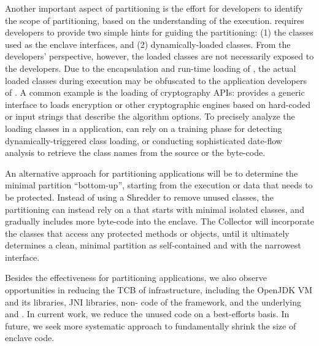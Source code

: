 Another important aspect of partitioning is
the effort for developers
to identify the scope of partitioning,
based on the understanding of the execution.
\civet{} requires developers to provide two simple hints
for guiding the partitioning:
(1) the classes used as the enclave interfaces,
and (2) dynamically-loaded classes.
From the developers' perspective,
however,
the loaded classes are not necessarily exposed to the developers.
Due to the encapsulation and run-time loading
of \java{},
the actual loaded classes during execution
may be obfuscated to the application developers of \java{}.
A common example is the loading of \java{} cryptography APIs:
\java{} provides a generic interface
to loads encryption or other cryptographic engines
based on hard-coded or input strings that describe the algorithm options.
To precisely analyze the loading classes
in a \java{} application,
\civet{} can rely on a training phase for detecting dynamically-triggered class loading,
or conducting sophisticated date-flow analysis
to retrieve the class names from the source or the byte-code.


An alternative approach for partitioning applications will be to determine the minimal partition ``bottom-up'',
starting from the execution or data that needs to be protected.
Instead of using a Shredder to remove unused classes,
the partitioning can instead rely on a  that 
starts with minimal isolated classes,
and gradually includes more byte-code into the enclave.
The Collector will
incorporate the classes
that access any protected methods or objects,
until it ultimately determines a clean,
minimal partition as self-contained and with the narrowest interface.

Besides the effectiveness for partitioning applications,
we also observe opportunities in reducing the TCB of infrastructure,
including the OpenJDK \java{} VM and its libraries,
JNI libraries,
non-\java{} code of the \civet{} framework,
and the underlying \libc{} and \graphene{} \libos{}.
In current work, we reduce the unused code on a best-efforts basis.
In future, we seek more
systematic approach
to fundamentally shrink the size of enclave code.

